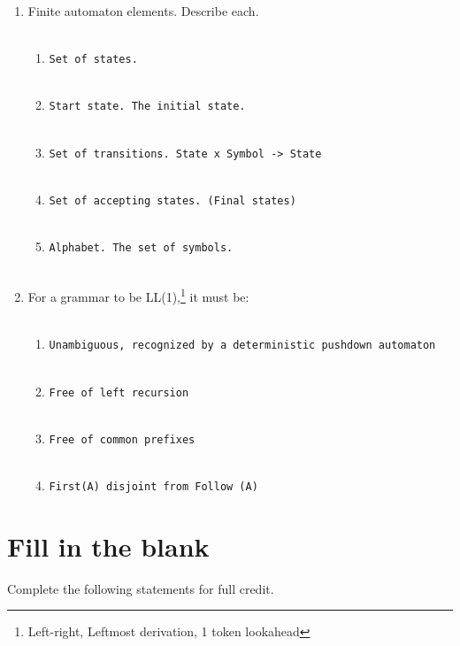 \documentclass[10pt]{amsart}
\begin{document}
\begin{enumerate}
\item Finite automaton elements. Describe each. \\\\

\begin{enumerate}
\item \verb+Set of states.+\\\\ %
\item \verb+Start state. The initial state.+\\\\ %
\item \verb+Set of transitions. State x Symbol -> State+\\\\ %
\item \verb+Set of accepting states. (Final states)+\\\\ %
\item \verb+Alphabet. The set of symbols.+\\\\ %
\end{enumerate}

\item For a grammar to be LL(1),\footnote{Left-right, Leftmost derivation, 1 token lookahead} it must be:\\\\

\begin{enumerate}
\item \verb+Unambiguous, recognized by a deterministic pushdown automaton+\\\\ %
\item \verb+Free of left recursion+\\\\ %
\item \verb+Free of common prefixes+\\\\ %
\item \verb+First(A) disjoint from Follow (A)+ %
\end{enumerate}
\end{enumerate}

\section{Fill in the blank}
Complete the following statements for full credit.\\
\end{document}
